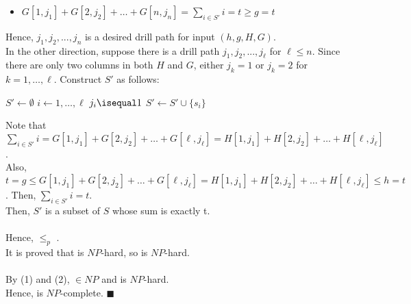\documentclass[11pt]{article}
\begin{document}
\begin{enumerate}
\begin{itemize}
        \item
            $G[1,j_1] + G[2,j_2] + \dots + G[n,j_n] = \sum\limits_{i\in S'}i = t \geq g = t$
        \end{itemize}
Hence, $j_1, j_2, ..., j_n$ is a desired drill path for input $(h, g, H, G)$. \\

In the other direction, suppose there is a drill path $j_1, j_2, ..., j_\ell$ for $\ell \leq n$.
Since there are only two columns in both $H$ and $G$, either $j_k = 1$ or $j_k=2$ for $k=1, \dots, \ell$. Construct $S'$ as follows:
\begin{codebox}
\zi $S' \gets \emptyset$
\zi \For $i \gets 1, \dots, \ell$
\zi     \Then \If $j_i \isequal 1$
\zi           \Then $S' \gets S'\cup \{s_i\}$
\end{codebox}
Note that $\sum\limits_{i\in S'}i = G[1,j_1] + G[2,j_2] + \dots + G[\ell,j_\ell] = H[1,j_1] + H[2,j_2] + \dots + H[\ell,j_\ell]$.\\
Also, $t =g\leq G[1,j_1] + G[2,j_2] + \dots + G[\ell,j_\ell] = H[1,j_1] + H[2,j_2] + \dots + H[\ell,j_\ell]\leq h=t$.
Then, $\sum\limits_{i\in S'}i=t$.\\
Then, $S'$ is a subset of $S$ whose sum is exactly t.\\
\\
Hence,  $\leq_p$ .\\
It is proved that  is $NP$-hard, so  is $NP$-hard.\\
\\
By (1) and (2),  $\in NP$ and  is $NP$-hard. \\Hence,  is $NP$-complete. $\blacksquare$





\end{enumerate}
\end{document}
